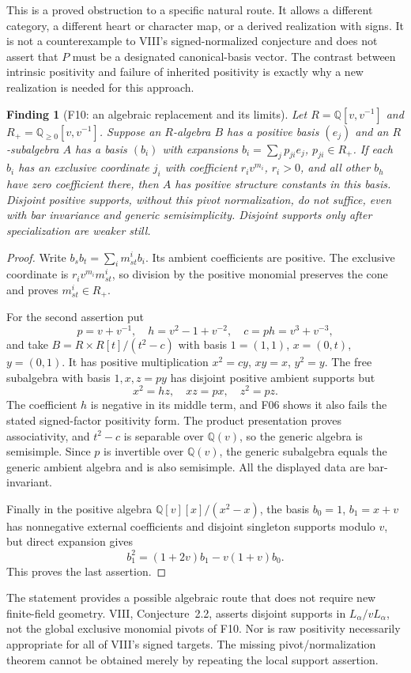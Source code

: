 \documentclass[11pt,a4paper]{article}
\newcommand{\Q}{\mathbb Q}\newcommand{\Z}{\mathbb Z}\newcommand{\C}{\mathbb C}\newcommand{\N}{\mathbb N}\newcommand{\F}{\mathbb F}
\newcommand{\fid}[1]{\textsf{#1}}\newcommand{\gate}[1]{\textsf{#1}}
\theoremstyle{named}\newtheorem{finding}{Finding}[section]
\theoremstyle{definition}\newtheorem{definition}[finding]{Definition}
\theoremstyle{remark}\newtheorem{remark}[finding]{Remark}
\begin{document}
This is a proved obstruction to a specific natural route. It allows a different category, a different heart or character map, or a derived realization with signs. It is not a counterexample to VIII's signed-normalized conjecture and does not assert that $P$ must be a designated canonical-basis vector. The contrast between intrinsic positivity and failure of inherited positivity is exactly why a new realization is needed for this approach.

\begin{finding}[\fid{F10}: an algebraic replacement and its limits]\label{f:pivots}
Let $R=\Q[v,v^{-1}]$ and $R_+=\Q_{\ge0}[v,v^{-1}]$. Suppose an $R$-algebra $B$ has a positive basis $(e_j)$ and an $R$-subalgebra $A$ has a basis $(b_i)$ with expansions $b_i=\sum_jp_{ji}e_j$, $p_{ji}\in R_+$. If each $b_i$ has an exclusive coordinate $j_i$ with coefficient $r_iv^{m_i}$, $r_i>0$, and all other $b_h$ have zero coefficient there, then $A$ has positive structure constants in this basis. Disjoint positive supports, without this pivot normalization, do not suffice, even with bar invariance and generic semisimplicity. Disjoint supports only after specialization are weaker still.
\end{finding}
\begin{proof}
Write $b_sb_t=\sum_i m_{st}^i b_i$. Its ambient coefficients are positive. The exclusive coordinate is $r_iv^{m_i}m_{st}^i$, so division by the positive monomial preserves the cone and proves $m_{st}^i\in R_+$.

For the second assertion put
\[
 p=v+v^{-1},\quad h=v^2-1+v^{-2},\quad c=ph=v^3+v^{-3},
\]
and take $B=R\times R[t]/(t^2-c)$ with basis
$1=(1,1)$, $x=(0,t)$, $y=(0,1)$. It has positive multiplication
$x^2=cy$, $xy=x$, $y^2=y$. The free subalgebra with basis $1,x,z=py$ has disjoint positive ambient supports but
\[
 x^2=hz,\quad xz=px,\quad z^2=pz.
\]
The coefficient $h$ is negative in its middle term, and \fid{F06} shows it also fails the stated signed-factor positivity form. The product presentation proves associativity, and $t^2-c$ is separable over $\Q(v)$, so the generic algebra is semisimple. Since $p$ is invertible over $\Q(v)$, the generic subalgebra equals the generic ambient algebra and is also semisimple. All the displayed data are bar-invariant.

Finally in the positive algebra $\Q[v][x]/(x^2-x)$, the basis $b_0=1$, $b_1=x+v$ has nonnegative external coefficients and disjoint singleton supports modulo $v$, but direct expansion gives
\[
 b_1^2=(1+2v)b_1-v(1+v)b_0.
\]
This proves the last assertion.
\end{proof}
The statement provides a possible algebraic route that does not require new finite-field geometry. VIII, Conjecture~2.2, asserts disjoint supports in $L_\alpha/vL_\alpha$, not the global exclusive monomial pivots of \fid{F10}. Nor is raw positivity necessarily appropriate for all of VIII's signed targets. The missing pivot/normalization theorem cannot be obtained merely by repeating the local support assertion.
\end{document}
